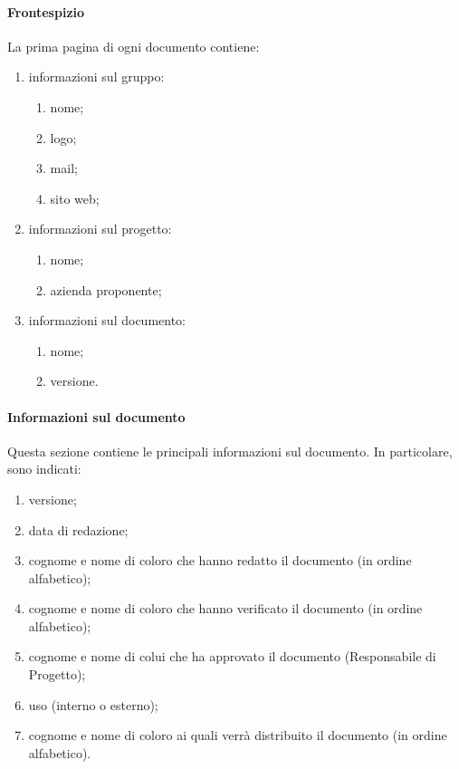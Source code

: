 			\paragraph{Frontespizio}
				La prima pagina di ogni documento contiene:
				\begin{enumerate}
					\item informazioni sul gruppo:
					\begin{enumerate}
						\item nome;
						\item logo;
						\item mail;
						\item sito web;
					\end{enumerate}
					\item informazioni sul progetto:
					\begin{enumerate}
						\item nome;
						\item azienda proponente;
					\end{enumerate}
					\item informazioni sul documento:
					\begin{enumerate}
						\item nome;
						\item versione.
					\end{enumerate}
				\end{enumerate}
			\paragraph{Informazioni sul documento}
				Questa sezione contiene le principali informazioni sul documento. In particolare, sono indicati:
				\begin{enumerate}
					\item versione;
					\item data di redazione;
					\item cognome e nome di coloro che hanno redatto il documento (in ordine alfabetico);
					\item cognome e nome di coloro che hanno verificato il documento (in ordine alfabetico);
					\item cognome e nome di colui che ha approvato il documento (Responsabile di Progetto);
					\item uso (interno o esterno);
					\item cognome e nome di coloro ai quali verrà distribuito il documento (in ordine alfabetico).
				\end{enumerate}
